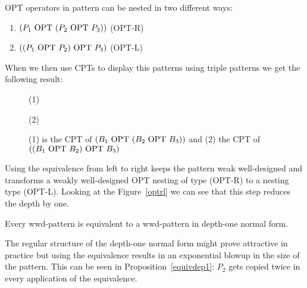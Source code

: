 \bigskip\noindent OPT operators in pattern can be nested in two different ways:
\begin{enumerate}
	\item $(P_1 \mbox{ OPT } (P_2 \mbox{ OPT } P_3))$ (OPT-R)
	\item $((P_1 \mbox{ OPT } P_2) \mbox{ OPT } P_3)$ (OPT-L)
\end{enumerate}
When we then use CPTs to display this patterns using triple patterns we get the following result:

\begin{figure}(1) 
\hspace{5cm}
(2) 
\caption{(1) is the CPT of $(B_1 \mbox{ OPT } (B_2 \mbox{ OPT } B_3))$ and 
(2) the CPT of $((B_1 \mbox{ OPT } B_2) \mbox{ OPT } B_3)$}
\end{figure}\label{optrl}


Using the equivalence from left to right keeps the pattern weak well-designed and
transforms a weakly well-designed OPT nesting of type (OPT-R) to a nesting type
(OPT-L). Looking at the Figure~\ref{optrl} we can see that this step reduces the depth by one.
\begin{corollary}
	Every wwd-pattern is equivalent to a wwd-pattern in depth-one normal form.
\end{corollary}
The regular structure of the depth-one normal form might prove attractive in
practice but using the equivalence results in an exponential blowup in the size
of the pattern. This can be seen in Proposition~\ref{equivdep1}: $P_2$ gets
copied twice in every application of the equivalence.

